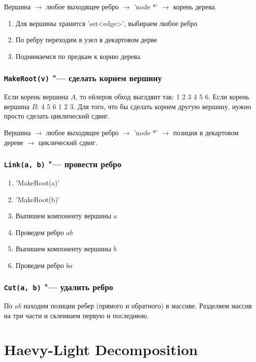 Вершина $\to$ любое выходящее ребро $\to$ \cpp'node *' $\to$ корень дерева.
\begin{enumerate}
	\item Для вершины хранится \cpp'set<edge>', выбираем любое ребро
	\item По ребру переходим в узел в декартовом дерве
	\item Поднимаемся по предкам к корню дерева.
\end{enumerate}

\subsubsection{\texttt{MakeRoot(v)} "--- сделать корнем вершину}


Если корень вершина $A$, то ейлеров обход выглдяит так: 1 2 3 4 5 6.
Если корень вершина $B$: 4 5 6 1 2 3.
Для того, что бы сделать корнем другую вершину, нужно просто сделать циклический сдвиг.

Вершина $\to$ любое выходящее ребро $\to$ \cpp'node *' $\to$ позиция в декартовом дереве $\to$ циклический сдвиг.

\subsubsection{\texttt{Link(a, b)} "--- провести ребро}

\begin{enumerate}
	\item \cpp'MakeRoot(a)'
	\item \cpp'MakeRoot(b)'
	\item Выпишем компоненту вершины $a$
	\item Проведем ребро $ab$
	\item Выпишем компоненту вершины $b$
	\item Проведем ребро $ba$
\end{enumerate}

\subsubsection{\texttt{Cut(a, b)} "--- удалить ребро}


По $ab$ находим позиции ребер (прямого и обратного) в массиве.
Разделяем массив на три части и склеиваем первую и последнюю.

\section{Haevy-Light Decomposition}

